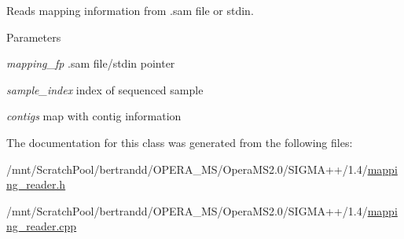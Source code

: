 Reads mapping information from .sam file or stdin. 
\begin{DoxyParams}{Parameters}
\item[{\em mapping\_\-fp}].sam file/stdin pointer \item[{\em sample\_\-index}]index of sequenced sample \item[{\em contigs}]map with contig information \end{DoxyParams}


The documentation for this class was generated from the following files:\begin{DoxyCompactItemize}
\item 
/mnt/ScratchPool/bertrandd/OPERA\_\-MS/OperaMS2.0/SIGMA++/1.4/\hyperlink{mapping__reader_8h}{mapping\_\-reader.h}\item 
/mnt/ScratchPool/bertrandd/OPERA\_\-MS/OperaMS2.0/SIGMA++/1.4/\hyperlink{mapping__reader_8cpp}{mapping\_\-reader.cpp}\end{DoxyCompactItemize}
